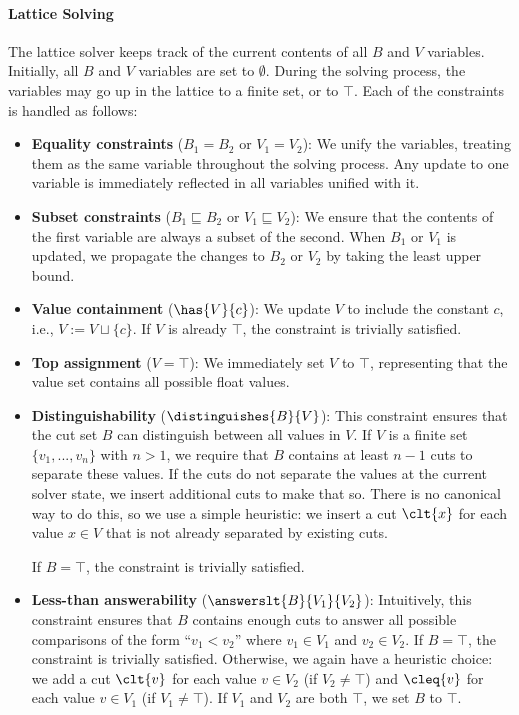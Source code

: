 \paragraph{Lattice Solving}

The lattice solver keeps track of the current contents of all $B$ and $V$ variables.
Initially, all $B$ and $V$ variables are set to $\emptyset$.
During the solving process, the variables may go up in the lattice to a finite set, or to $\top$.
Each of the constraints is handled as follows:

\begin{itemize}
    \item \textbf{Equality constraints} ($B_1 = B_2$ or $V_1 = V_2$): We unify the variables, treating them as the same variable throughout the solving process. Any update to one variable is immediately reflected in all variables unified with it.
    
    \item \textbf{Subset constraints} ($B_1 \sqsubseteq B_2$ or $V_1 \sqsubseteq V_2$): We ensure that the contents of the first variable are always a subset of the second. When $B_1$ or $V_1$ is updated, we propagate the changes to $B_2$ or $V_2$ by taking the least upper bound.
    
    \item \textbf{Value containment} ($\has{V}{c}$): We update $V$ to include the constant $c$, i.e., $V := V \sqcup \{c\}$. If $V$ is already $\top$, the constraint is trivially satisfied.
    
    \item \textbf{Top assignment} ($V = \top$): We immediately set $V$ to $\top$, representing that the value set contains all possible float values.
    
    \item \textbf{Distinguishability} ($\distinguishes{B}{V}$): This constraint ensures that the cut set $B$ can distinguish between all values in $V$. If $V$ is a finite set $\{v_1, ..., v_n\}$ with $n > 1$, we require that $B$ contains at least $n-1$ cuts to separate these values. If the cuts do not separate the values at the current solver state, we insert additional cuts to make that so. There is no canonical way to do this, so we use a simple heuristic: we insert a cut $\clt{x}$ for each value $x \in V$ that is not already separated by existing cuts.
    
    If $B = \top$, the constraint is trivially satisfied.
    
    \item \textbf{Less-than answerability} ($\answerslt{B}{V_1}{V_2}$): Intuitively, this constraint ensures that $B$ contains enough cuts to answer all possible comparisons of the form ``$v_1 < v_2$'' where $v_1 \in V_1$ and $v_2 \in V_2$.
    If $B = \top$, the constraint is trivially satisfied.
    Otherwise, we again have a heuristic choice: we add a cut $\clt{v}$ for each value $v \in V_2$ (if $V_2 \neq \top$) and $\cleq{v}$ for each value $v \in V_1$ (if $V_1 \neq \top$). If $V_1$ and $V_2$ are both $\top$, we set $B$ to $\top$.
    

\end{itemize}
